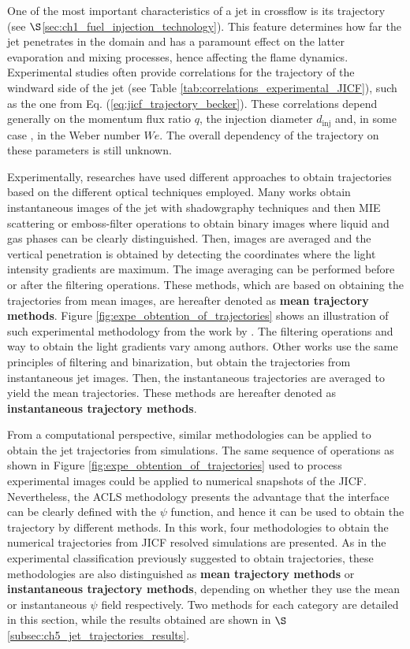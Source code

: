 One of the most important characteristics of a jet in crossflow is its trajectory (see $\S$\ref{sec:ch1_fuel_injection_technology}). This feature determines how far the jet penetrates in the domain and has a paramount effect on the latter evaporation and mixing processes, hence affecting the flame dynamics. Experimental studies often provide correlations for the trajectory of the windward side of the jet (see Table \ref{tab:correlations_experimental_JICF}), such as the one from Eq. (\ref{eq:jicf_trajectory_becker}). These correlations depend generally on the momentum flux ratio $q$, the injection diameter $d_\mathrm{inj}$ and, in some case , in the Weber number $We$. The overall dependency of the trajectory on these parameters is still unknown.

Experimentally, researches have used different approaches to obtain trajectories based on the different optical techniques employed. Many works  obtain instantaneous images of the jet with shadowgraphy techniques and then MIE scattering or emboss-filter operations to obtain binary images where liquid and gas phases can be clearly distinguished. Then, images are averaged and the vertical penetration is obtained by detecting the coordinates where the light intensity gradients are maximum. The image averaging can be performed before or after the filtering operations. These methods, which are based on obtaining the trajectories from mean images, are hereafter denoted as \textbf{mean trajectory methods}. Figure \ref{fig:expe_obtention_of_trajectories} shows an illustration of such experimental methodology from the work by . The filtering operations and way to obtain the light gradients vary among authors. Other works  use the same principles of filtering and binarization, but obtain the trajectories from instantaneous jet images. Then, the instantaneous trajectories are averaged to yield the mean trajectories. These methods are hereafter denoted as \textbf{instantaneous trajectory methods}.

From a computational perspective, similar methodologies can be applied to obtain the jet trajectories from simulations. The same sequence of operations as shown in Figure \ref{fig:expe_obtention_of_trajectories} used to process experimental images could be applied to numerical snapshots of the JICF. Nevertheless, the ACLS methodology presents the advantage that the interface can be clearly defined with the $\psi$ function, and hence it can be used to obtain the trajectory by different methods. In this work, four methodologies to obtain the numerical trajectories from JICF resolved simulations are presented. As in the experimental classification previously suggested to obtain trajectories, these methodologies are also distinguished as \textbf{mean trajectory methods} or \textbf{instantaneous trajectory methods}, depending on whether they use the mean or instantaneous $\psi$ field respectively. Two methods for each category are detailed in this section, while the results obtained are shown in $\S$\ref{subsec:ch5_jet_trajectories_results}.

